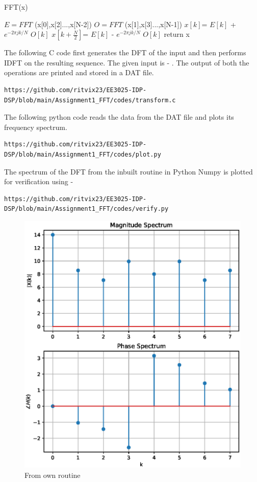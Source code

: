 \documentclass[journal,12pt,twocolumn]{IEEEtran}
\begin{document}
\begin{algorithm}
\caption{FFT(x)}
\begin{algorithmic} 
\STATE $E =FFT$ (x[0],x[2]...,x[N-2])
\STATE  $O =FFT$ (x[1],x[3]...,x[N-1])
\STATE $x[k]$= $E[k]$ + $e^{-2\pi jk/N}$ $O[k]$
\STATE $x[k+ \frac{N}{2}]$= $E[k]$ - $e^{-2\pi jk/N}$ $O[k]$
\ENDFOR
\ENDIF
\STATE return x

\end{algorithmic}
\end{algorithm}
The following C code first generates the DFT of the input and then performs IDFT on the resulting sequence. The given input is - {}. The output of both the operations are printed and stored in a DAT file.
\begin{lstlisting}
https://github.com/ritvix23/EE3025-IDP-DSP/blob/main/Assignment1_FFT/codes/transform.c
\end{lstlisting}
The following python code reads the data from the DAT file and plots its frequency spectrum.
\begin{lstlisting}
https://github.com/ritvix23/EE3025-IDP-DSP/blob/main/Assignment1_FFT/codes/plot.py
\end{lstlisting}
The spectrum of the DFT from the inbuilt routine in Python Numpy is plotted for verification using - 
\begin{lstlisting}
https://github.com/ritvix23/EE3025-IDP-DSP/blob/main/Assignment1_FFT/codes/verify.py
\end{lstlisting}
\begin{figure}
    \centering
    \includegraphics[width=\columnwidth]{./figs/dftown.eps}
    \caption{From own routine}
    \label{fig:dftown}
\end{figure}
\end{document}
